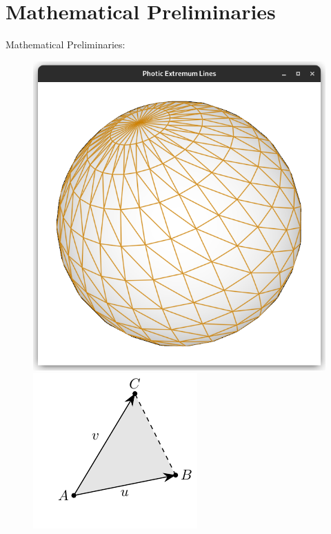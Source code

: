 \documentclass[aspectratio=169]{beamer}
\begin{document}
\section{Mathematical Preliminaries}
  \begin{frame}{Mathematical Preliminaries: %
  }
    \begin{figure}
      \center
      \includegraphics[height=0.45\textheight,trim={15px 15 15 50},clip]{images/sphere-wireframe.png}
      \includegraphics[height=0.45\textheight]{figures/triangle.pdf}

\end{figure}
\end{frame}
\end{document}
